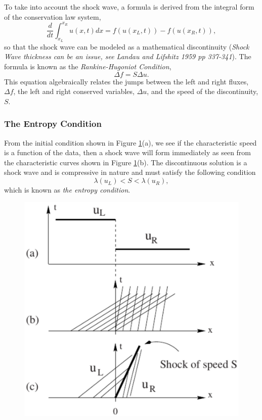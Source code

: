 \documentclass[]{article}
\begin{document}
			To take into account the shock wave, a formula is derived from the integral form of the conservation law system,
			\begin{equation}
				\frac{d}{dt}\int_{x_L}^{x_R}u(x,t)dx = f(u(x_L, t)) - f(u(x_R,t)),
			\end{equation}so that the shock wave can be modeled as a mathematical discontinuity (\textit{Shock Wave thickness can be an issue, see Landau and Lifshitz 1959 pp 337-341}). The formula is known as the \textit{Rankine-Hugoniot Condition},
			\begin{equation}
				\Delta f = S \Delta u.
				\label{RHC}
			\end{equation}
			This equation algebraically relates the jumps between the left and right fluxes, $ \Delta f $, the left and right conserved variables, $ \Delta u $, and the speed of the discontinuity, $ S $.
		
		
		\subsubsection{The Entropy Condition}
		
		From the initial condition shown in  Figure \ref{ShockWave}(a), we see if the characteristic speed is a function of the data, then a shock wave will form immediately as seen from the characteristic curves shown in Figure \ref{ShockWave}(b). The discontinuous solution is a shock wave and is compressive in nature and must satisfy the following condition
		\begin{equation}
		\lambda(u_L) < S < \lambda(u_R),
		\end{equation}
		which is known as \textit{the entropy condition}.
		\begin{figure}[h] 	
			\centering
			\includegraphics[scale=.50]{ShockWave}
			\caption{}
			\label{ShockWave}
		\end{figure}
		
\end{document}
